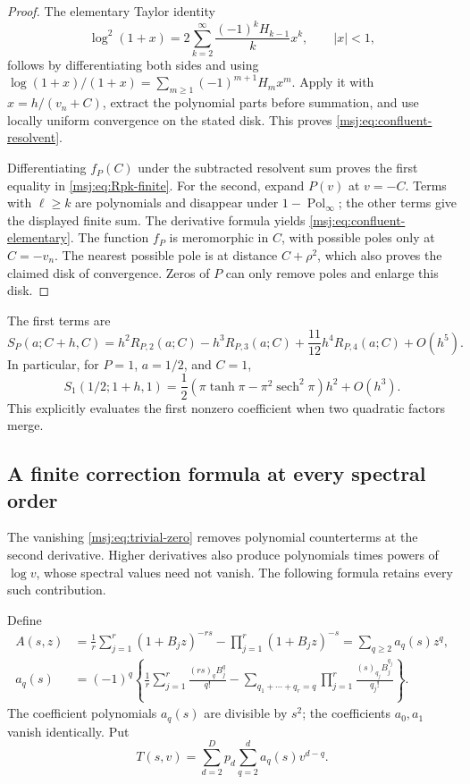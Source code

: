 \documentclass[11pt,a4paper]{article}
\numberwithin{equation}{section}
\theoremstyle{plain}
\theoremstyle{definition}
\theoremstyle{remark}
\begin{document}
\begin{proof}
The elementary Taylor identity
\[
 \log^2(1+x)=2\sum_{k=2}^{\infty}\frac{(-1)^kH_{k-1}}{k}x^k,
 \qquad |x|<1,
\]
follows by differentiating both sides and using
$\log(1+x)/(1+x)=\sum_{m\ge1}(-1)^{m+1}H_mx^m$.
Apply it with $x=h/(v_n+C)$, extract the polynomial parts before
summation, and use locally uniform convergence on the stated disk.
This proves \eqref{msj:eq:confluent-resolvent}.

Differentiating $f_P(C)$ under the subtracted resolvent sum proves the
first equality in \eqref{msj:eq:Rpk-finite}. For the second, expand
$P(v)$ at $v=-C$. Terms with $\ell\ge k$ are polynomials and disappear
under $1-\operatorname{Pol}_{\infty}$; the other terms give the displayed
finite sum. The derivative formula yields
\eqref{msj:eq:confluent-elementary}. The function $f_P$ is meromorphic
in $C$, with possible poles only at $C=-v_n$. The nearest possible pole
is at distance $C+\rho^2$, which also proves the claimed disk of
convergence. Zeros of $P$ can only remove poles and enlarge this disk.
\end{proof}

The first terms are
\[
 S_P(a;C+h,C)=h^2R_{P,2}(a;C)-h^3R_{P,3}(a;C)
                   +\frac{11}{12}h^4R_{P,4}(a;C)+O(h^5).
\]
In particular, for $P=1$, $a=1/2$, and $C=1$,
\begin{equation}
 S_1(1/2;1+h,1)
 =\frac12\left(\pi\tanh\pi-\pi^2\operatorname{sech}^2\pi\right)h^2
                                                    +O(h^3).
 \label{msj:eq:confluent-example}
\end{equation}
This explicitly evaluates the first nonzero coefficient when two
quadratic factors merge.

\subsection{A finite correction formula at every spectral order}

The vanishing \eqref{msj:eq:trivial-zero} removes polynomial
counterterms at the second derivative. Higher derivatives also produce
polynomials times powers of $\log v$, whose spectral values need not
vanish. The following formula retains every such contribution.

Define
\begin{align}
 A(s,z)&=\frac1r\sum_{j=1}^r(1+B_jz)^{-rs}
                         -\prod_{j=1}^r(1+B_jz)^{-s}
          =\sum_{q\ge2}a_q(s)z^q,
 \label{msj:eq:A}\\
 a_q(s)&=(-1)^q\left\{
  \frac1r\sum_{j=1}^r\frac{(rs)_qB_j^q}{q!}
  -\sum_{q_1+\cdots+q_r=q}\prod_{j=1}^r
                      \frac{(s)_{q_j}B_j^{q_j}}{q_j!}\right\}.
 \label{msj:eq:aq}
\end{align}
The coefficient polynomials $a_q(s)$ are divisible by $s^2$; the
coefficients $a_0,a_1$ vanish identically. Put
\begin{equation}
 T(s,v)=\sum_{d=2}^{D}p_d\sum_{q=2}^{d}a_q(s)v^{d-q}.
 \label{msj:eq:T-spectral}
\end{equation}
\end{document}
